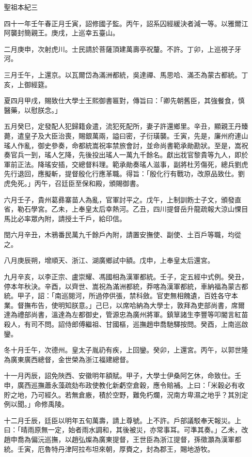 
\begin{pinyinscope}
聖祖本紀三

四十一年壬午春正月壬寅，詔修國子監。丙午，詔系囚經緩決者減一等。以雅爾江阿襲封簡親王。庚戌，上巡幸五臺山。

二月庚申，次射虎川。士民請於菩薩頂建萬壽亭祝釐。不許。丁卯，上巡視子牙河。

三月壬午，上還京。以瓦爾岱為滿洲都統，吳達禪、馬思哈、滿丕為蒙古都統。丁亥，上御經筵。

夏四月甲戌，賜致仕大學士王熙御書匾對，傳旨曰：「卿先朝舊臣，其強餐食，慎醫藥，以慰朕念。」

五月癸巳，定發配人犯歸籍僉遣，流犯死配所，妻子許還鄉里。辛丑，顯親王丹臻薨，遣皇子及大臣治喪，賜銀萬兩，謚曰密，子衍璜襲。壬寅，先是，廉州府連山瑤人作亂，御史參奏，命都統嵩祝率禁旅會討，並命尚書範承勛勘狀。至是，嵩祝奏官兵一到，瑤人乞降，先後投出瑤人一萬九千餘名。獻出戕官黎貴等九人，即於軍前正法。降瑤安插，交總督料理。範承勛奏瑤人滋事，副將杜芳傷死，總兵劉虎先行退回，應擬斬，提督殷化行應革職。得旨：「殷化行有戰功，改原品致仕。劉虎免死。」丙午，召廷臣至保和殿，頒賜御書。

六月壬子，貴州葛彞寨苗人為亂，官軍討平之。戊午，上制訓飭士子文，頒發直省，勒石學宮。乙未，上奉皇太后幸熱河。乙丑，四川提督岳升龍疏報大涼山惈目馬比必率眾內附，請授土千戶，給印信。

閏六月辛丑，木鴉番民萬九千餘戶內附，請置安撫使、副使、土百戶等職，均從之。

八月庚辰朔，增順天、浙江、湖廣鄉試中額。戊申，上奉皇太后還宮。

九月辛亥，以李正宗、盧崇耀、馮國相為漢軍都統。壬子，定五經中式例。癸丑，停本年秋決。辛酉，以齊世、嵩祝為滿洲都統，莽喀為漢軍都統，車納福為蒙古都統。甲子，詔：「南巡閱河，所過停供張，禁科斂。官吏無相餽遺，百姓各守本業。督撫布告，使明知朕意。」己巳，以席哈納為大學士，敦拜為吏部尚書，席爾達為禮部尚書，溫達為左都御史，管源忠為廣州將軍。鎮筸諸生李豐等叩閽言紅苗殺人，有司不問。詔侍郎傅繼祖、甘國樞，巡撫趙申喬馳驛按問。癸酉，上南巡啟鑾。

冬十月壬午，次德州。皇太子胤礽有疾，上回鑾。癸卯，上還宮。丙午，以郭世隆為廣東廣西總督，金世榮為浙江福建總督。

十一月丙辰，詔免陜西、安徽明年額賦。甲子，大學士伊桑阿乞休，命致仕。壬申，廣西巡撫蕭永藻疏劾布政使教化新虧空倉穀，應令賠補。上曰：「米穀必有收貯之地，乃可經久。若無倉廒，積於空野，難免朽爛，況南方卑濕之地乎？其別定例以聞。」命修禹陵。

十二月壬辰，廷臣以明年五旬萬壽，請上尊號。上不許。戶部議駁奉天報災。上曰：「晴雨原無一定，始者雨水調和，其後被災，亦常事耳。可準其奏。」乙未，改趙申喬為偏沅巡撫，以趙弘燦為廣東提督，王世臣為浙江提督，孫徵灝為漢軍都統。壬寅，厄魯特丹津阿拉布坦來朝，厚賚之，封為郡王，賜地游牧。


\end{pinyinscope}
